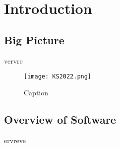 \chapter{Introduction} \label{sec:Introduction}

\section{Big Picture}
vervre

\begin{figure}[h]
    \centering
    \texttt{[image: KS2022.png]}
    \caption{Caption}
    \label{fig:graphicalabstract}
\end{figure}

\cite{Krajewski2024Nimplex}

\section{Overview of Software}

ervreve

\printbibliography[heading=subbibintoc]